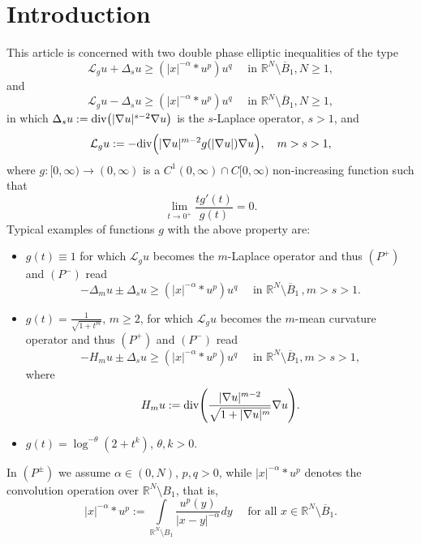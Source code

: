 \documentclass[leqno,12pt]{article}
\numberwithin{equation}{section}
\newcommand{\R}{\mathbb R}
\newcommand{\Ro}{\mathbb R^N\setminus \overline B_1}
\newcommand{\Lg}{{\mathcal L}_g}
\begin{document}
\section{Introduction}

This article is concerned with two double phase elliptic inequalities of the type
\begin{equation*}
\Lg u+\Delta_s u\geq (|x|^{-\alpha}*u^p)u^q \quad\mbox{ in }\Ro,N\geq 1, \tag{$P^+$}
\end{equation*}
and
\begin{equation*}
\Lg u-\Delta_s u\geq (|x|^{-\alpha}*u^p)u^q \quad\mbox{ in }\Ro, N\geq 1,\tag{$P^-$}
\end{equation*}
in which $\Delta_s u:={\rm div}\big(|\nabla u|^{s-2}\nabla u\big)$ is the $s$-Laplace operator, $s>1$, and
$$
\Lg u:= -{\rm div}\Big(|\nabla u|^{m-2}g(|\nabla u|)\nabla u\Big),\quad m>s>1,
$$
where $g:[0, \infty)\to (0, \infty)$ is a $C^1(0, \infty)\cap C[0, \infty)$  non-increasing function such that 
\begin{equation}\label{cong}
\lim_{t\to 0^+}\frac{tg'(t)}{g(t)}=0.
\end{equation}
Typical examples of functions $g$ with the above property are:
\begin{itemize} 
\item $g(t)\equiv 1$ for which $\Lg u$ becomes the $m$-Laplace operator and thus $(P^+)$ and $(P^-)$ read 
\begin{equation}\label{lap1}
-\Delta_m u\pm \Delta_s u\geq (|x|^{-\alpha}*u^p)u^q \quad\mbox{ in }\Ro\, , m>s>1.
\end{equation}


\item $g(t)=\frac{1}{\sqrt{1+t^m}}$, $m\geq 2$, for which $\Lg u$ becomes the $m$-mean curvature operator and thus $(P^+)$ and $(P^-)$ read 
\begin{equation}\label{lap2}
-H_m u\pm \Delta_s u\geq (|x|^{-\alpha}*u^p)u^q \quad\mbox{ in }\Ro, m>s>1,
\end{equation}
where 
\begin{equation}\label{mcv}
H_m u:={\rm div}\Bigg( \frac{|\nabla u|^{m-2}}{\sqrt{1+|\nabla u|^m}}\nabla u\Bigg).
\end{equation}
\item $g(t)=\log^{-\theta}(2+t^k) $, $\theta, k>0$.
\end{itemize} 
In $(P^\pm)$ we assume $\alpha\in (0, N)$, $p, q>0$, while $|x|^{-\alpha}*u^p$ denotes the convolution operation over $\R^N\setminus B_1$, that is,
$$ 
|x|^{-\alpha}*u^p:=\int\limits_{\R^N\setminus B_1} \frac{u^p(y)}{|x-y|^{-\alpha}} dy \quad\mbox{ for all }x\in \Ro. 
$$ 
\end{document}
